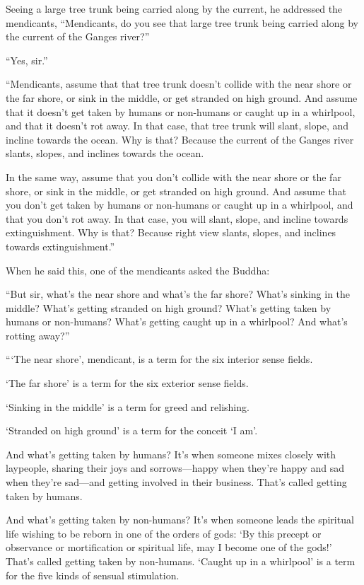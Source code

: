 \documentclass[12pt,openany]{book}%
\begin{document}
Seeing a large tree trunk being carried along by the current, he addressed the mendicants, “Mendicants, do you see that large tree trunk being carried along by the current of the Ganges river?” 

“Yes, sir.” 

“Mendicants, assume that that tree trunk doesn’t collide with the near shore or the far shore, or sink in the middle, or get stranded on high ground. And assume that it doesn’t get taken by humans or non-humans or caught up in a whirlpool, and that it doesn’t rot away. In that case, that tree trunk will slant, slope, and incline towards the ocean. Why is that? Because the current of the Ganges river slants, slopes, and inclines towards the ocean. 

In the same way, assume that you don’t collide with the near shore or the far shore, or sink in the middle, or get stranded on high ground. And assume that you don’t get taken by humans or non-humans or caught up in a whirlpool, and that you don’t rot away. In that case, you will slant, slope, and incline towards extinguishment. Why is that? Because right view slants, slopes, and inclines towards extinguishment.” 

When he said this, one of the mendicants asked the Buddha: 

“But sir, what’s the near shore and what’s the far shore? What’s sinking in the middle? What’s getting stranded on high ground? What’s getting taken by humans or non-humans? What’s getting caught up in a whirlpool? And what’s rotting away?” 

“‘The near shore’, mendicant, is a term for the six interior sense fields. 

‘The far shore’ is a term for the six exterior sense fields. 

‘Sinking in the middle’ is a term for greed and relishing. 

‘Stranded on high ground’ is a term for the conceit ‘I am’. 

And what’s getting taken by humans? It’s when someone mixes closely with laypeople, sharing their joys and sorrows—happy when they’re happy and sad when they’re sad—and getting involved in their business. That’s called getting taken by humans. 

And what’s getting taken by non-humans? It’s when someone leads the spiritual life wishing to be reborn in one of the orders of gods: ‘By this precept or observance or mortification or spiritual life, may I become one of the gods!’ That’s called getting taken by non-humans. ‘Caught up in a whirlpool’ is a term for the five kinds of sensual stimulation. 
\end{document}
